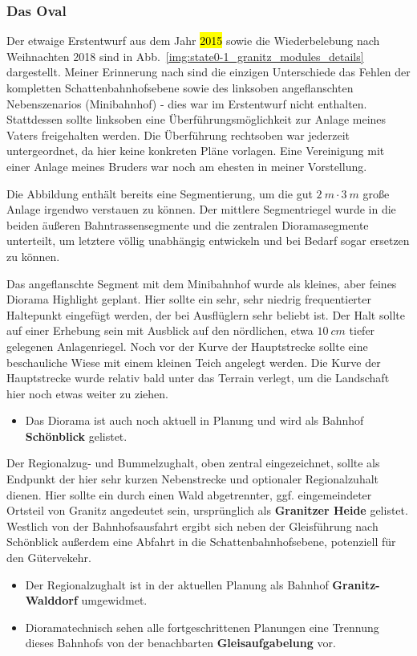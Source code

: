 \subsubsection{Das Oval}
\label{sec:map_development_state1}

Der etwaige Erstentwurf aus dem Jahr \hl{2015} sowie die Wiederbelebung nach Weihnachten 2018 sind in Abb.~\ref{img:state0-1_granitz_modules_details} dargestellt.
Meiner Erinnerung nach sind die einzigen Unterschiede das Fehlen der kompletten Schattenbahnhofsebene sowie des linksoben angeflanschten Nebenszenarios (Minibahnhof) - dies war im Erstentwurf nicht enthalten.
Stattdessen sollte linksoben eine \"Uberf\"uhrungsm\"oglichkeit zur Anlage meines Vaters freigehalten werden.
Die \"Uberf\"uhrung rechtsoben war jederzeit untergeordnet, da hier keine konkreten Pl\"ane vorlagen.
Eine Vereinigung mit einer Anlage meines Bruders war noch am ehesten in meiner Vorstellung.

Die Abbildung enth\"alt bereits eine Segmentierung, um die gut $2~m \cdot 3~m$ gro{\ss}e Anlage irgendwo verstauen zu k\"onnen.
Der mittlere Segmentriegel wurde in die beiden \"au{\ss}eren Bahntrassensegmente und die zentralen Dioramasegmente unterteilt, um letztere v\"ollig unabh\"angig entwickeln und bei Bedarf sogar ersetzen zu k\"onnen.

Das angeflanschte Segment mit dem Minibahnhof wurde als kleines, aber feines Diorama Highlight geplant.
Hier sollte ein sehr, sehr niedrig frequentierter Haltepunkt eingef\"ugt werden, der bei Ausfl\"uglern sehr beliebt ist.
Der Halt sollte auf einer Erhebung sein mit Ausblick auf den n\"ordlichen, etwa $10~cm$ tiefer gelegenen Anlagenriegel.
Noch vor der Kurve der Hauptstrecke sollte eine beschauliche Wiese mit einem kleinen Teich angelegt werden.
Die Kurve der Hauptstrecke wurde relativ bald unter das Terrain verlegt, um die Landschaft hier noch etwas weiter zu ziehen.
\begin{itemize}
	\item Das Diorama ist auch noch aktuell in Planung und wird als Bahnhof \textbf{Sch\"onblick} gelistet.
\end{itemize}

Der Regionalzug- und Bummelzughalt, oben zentral eingezeichnet, sollte als Endpunkt der hier sehr kurzen Nebenstrecke und optionaler Regionalzuhalt dienen.
Hier sollte ein durch einen Wald abgetrennter, ggf. eingemeindeter Ortsteil von Granitz angedeutet sein, urspr\"unglich als \textbf{Granitzer Heide} gelistet.
Westlich von der Bahnhofsausfahrt ergibt sich neben der Gleisf\"uhrung nach Sch\"onblick au{\ss}erdem eine Abfahrt in die Schattenbahnhofsebene, potenziell f\"ur den G\"utervekehr.
\begin{itemize}
	\item Der Regionalzughalt ist in der aktuellen Planung als Bahnhof \textbf{Granitz-Walddorf} umgewidmet.
	\item Dioramatechnisch sehen alle fortgeschrittenen Planungen eine Trennung dieses Bahnhofs von der benachbarten \textbf{Gleisaufgabelung} vor.
\end{itemize}

